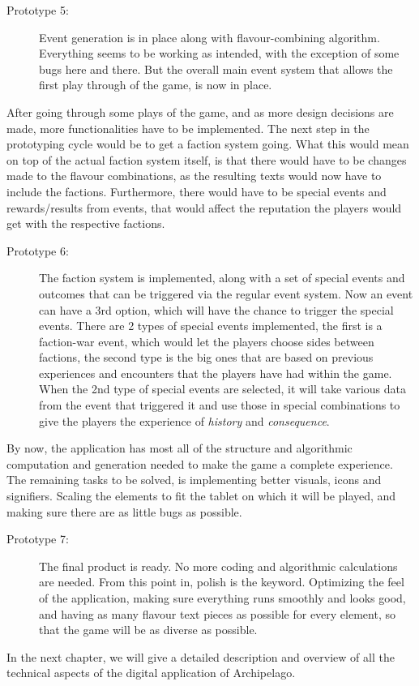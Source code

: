 \begin{description}
\item[Prototype 5:] Event generation is in place along with flavour-combining algorithm. Everything seems to be working as intended, with the exception of some bugs here and there. But the overall main event system that allows the first play through of the game, is now in place.
\end{description}

After going through some plays of the game, and as more design decisions are made, more functionalities have to be implemented. The next step in the prototyping cycle would be to get a faction system going. What this would mean on top of the actual faction system itself, is that there would have to be changes made to the flavour combinations, as the resulting texts would now have to include the factions. Furthermore, there would have to be special events and rewards/results from events, that would affect the reputation the players would get with the respective factions.

\begin{description}
\item[Prototype 6:]
The faction system is implemented, along with a set of special events and outcomes that can be triggered via the regular event system. Now an event can have a 3rd option, which will have the chance to trigger the special events. There are 2 types of special events implemented, the first is a faction-war event, which would let the players choose sides between factions, the second type is the big ones that are based on previous experiences and encounters that the players have had within the game. When the 2nd type of special events are selected, it will take various data from the event that triggered it and use those in special combinations to give the players the experience of \textit{history} and \textit{consequence}.
\end{description}

By now, the application has most all of the structure and algorithmic computation and generation needed to make the game a complete experience.
The remaining tasks to be solved, is implementing better visuals, icons and signifiers. Scaling the elements to fit the tablet on which it will be played, and making sure there are as little bugs as possible.

\begin{description}
\item[Prototype 7:]
The final product is ready. No more coding and algorithmic calculations are needed. From this point in, polish is the keyword. Optimizing the feel of the application, making sure everything runs smoothly and looks good, and having as many flavour text pieces as possible for every element, so that the game will be as diverse as possible.
\end{description}

In the next chapter, we will give a detailed description and overview of all the technical aspects of the digital application of Archipelago. 

